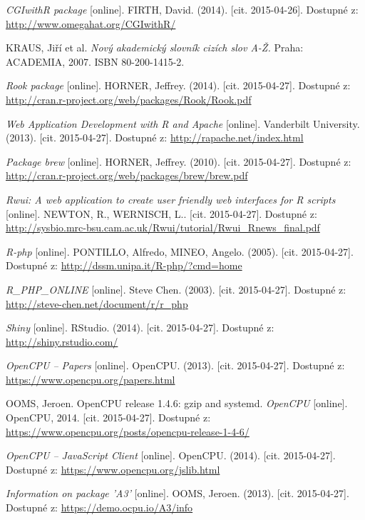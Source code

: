 \documentclass[thesis=B,czech]{FITthesis}[2012/06/26]
\begin{document}
\begin{thebibliography}{Per00}
\emph{CGIwithR package} [online]. FIRTH, David. (2014). [cit. 2015-04-26]. Dostupné z: \url{http://www.omegahat.org/CGIwithR/} 

KRAUS, Jiří et al. \emph{Nový akademický slovník cizích slov A-Ž.} Praha: ACADEMIA, 2007. ISBN 80-200-1415-2.

\emph{Rook package} [online]. HORNER, Jeffrey. (2014). [cit. 2015-04-27]. Dostupné z: \url{http://cran.r-project.org/web/packages/Rook/Rook.pdf} 

\emph{Web Application Development with R and Apache} [online]. Vanderbilt University. (2013). [cit. 2015-04-27]. 
Dostupné z: \url{http://rapache.net/index.html}

\emph{Package brew} [online]. HORNER, Jeffrey. (2010). [cit. 2015-04-27]. Dostupné z: \url{http://cran.r-project.org/web/packages/brew/brew.pdf} 

\emph{Rwui: A web application to create user 
friendly web interfaces for R scripts} [online]. NEWTON, R., WERNISCH, L.. [cit. 2015-04-27]. Dostupné z: \url{http://sysbio.mrc-bsu.cam.ac.uk/Rwui/tutorial/Rwui\_Rnews\_final.pdf}

\emph{R-php} [online]. PONTILLO, Alfredo, MINEO, Angelo. (2005). [cit. 2015-04-27]. Dostupné z: \url{http://dssm.unipa.it/R-php/?cmd=home}

\emph{R\_PHP\_ONLINE} [online]. Steve Chen. (2003). [cit. 2015-04-27]. Dostupné z: \url{http://steve-chen.net/document/r/r\_php}

\emph{Shiny} [online]. RStudio. (2014). [cit. 2015-04-27]. Dostupné z: \url{http://shiny.rstudio.com/}

\emph{OpenCPU – Papers} [online]. OpenCPU. (2013). [cit. 2015-04-27]. Dostupné z: \url{https://www.opencpu.org/papers.html}

OOMS, Jeroen. OpenCPU release 1.4.6: gzip and systemd. \emph{OpenCPU} [online]. OpenCPU, 2014. [cit. 2015-04-27]. 
Dostupné z: \url{https://www.opencpu.org/posts/opencpu-release-1-4-6/}

\emph{OpenCPU – JavaScript Client} [online]. OpenCPU. (2014). [cit. 2015-04-27]. Dostupné z: \url{https://www.opencpu.org/jslib.html}

\emph{Information on package ’A3’} [online]. OOMS, Jeroen. (2013). [cit. 2015-04-27]. Dostupné z: \url{https://demo.ocpu.io/A3/info}


\end{thebibliography}
\end{document}
